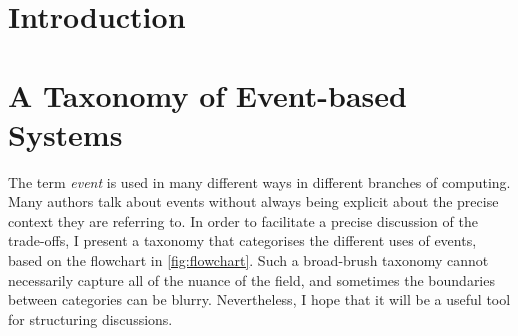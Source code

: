 \documentclass[sigconf,nonacm]{acmart}
\begin{document}

\section{Introduction}

\section{A Taxonomy of Event-based Systems}

The term \emph{event} is used in many different ways in different branches of computing.
Many authors talk about events without always being explicit about the precise context they are referring to.
In order to facilitate a precise discussion of the trade-offs, I present a taxonomy that categorises the different uses of events, based on the flowchart in \autoref{fig:flowchart}.
Such a broad-brush taxonomy cannot necessarily capture all of the nuance of the field, and sometimes the boundaries between categories can be blurry.
Nevertheless, I hope that it will be a useful tool for structuring discussions.
\end{document}
